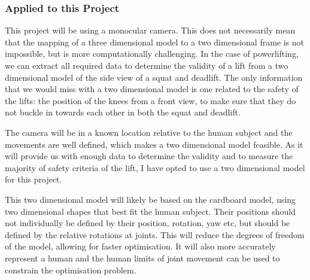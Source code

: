 \subsubsection{Applied to this Project}

This project will be using a monocular camera. This does not necessarily mean that the mapping of a three dimensional model to a two dimensional frame is not impossible, but is more computationally challenging. In the case of powerlifting, we can extract all required data to determine the validity of a lift from a two dimensional model of the side view of a squat and deadlift. The only information that we would miss with a two dimensional model is one related to the safety of the lifts: the position of the knees from a front view, to make sure that they do not buckle in towards each other in both the squat and deadlift.

The camera will be in a known location relative to the human subject and the movements are well defined, which makes a two dimensional model feasible. As it will provide us with enough data to determine the validity and to measure the majority of safety criteria of the lift, I have opted to use a two dimensional model for this project.

This two dimensional model will likely be based on the cardboard model, using two dimensional shapes that best fit the human subject. Their positions should not individually be defined by their position, rotation, yaw etc, but should be defined by the relative rotations at joints. This will reduce the degrees of freedom of the model, allowing for faster optimisation. It will also more accurately represent a human and the human limits of joint movement can be used to constrain the optimisation problem.